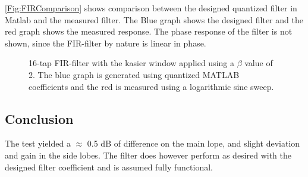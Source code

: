 \autoref{Fig:FIRComparison} shows comparison between the designed quantized filter in Matlab and the measured filter. The Blue graph shows the designed filter and the red graph shows the measured response. The phase response of the filter is not shown, since the FIR-filter by nature is linear in phase.
	
%	

\begin{figure}[H]
	\centering
	
	\caption{16-tap FIR-filter with the kasier window applied using a $\beta$ value of 2. The blue graph is generated using quantized MATLAB coefficients and the red is measured using a logarithmic sine sweep.} 
	\label{Fig:FIRComparison}
\end{figure}

\subsection{Conclusion}
The test yielded a $\approx$ 0.5 dB of difference on the main lope, and slight deviation and gain in the side lobes. The filter does however perform as desired with the designed filter coefficient and is assumed fully functional.




